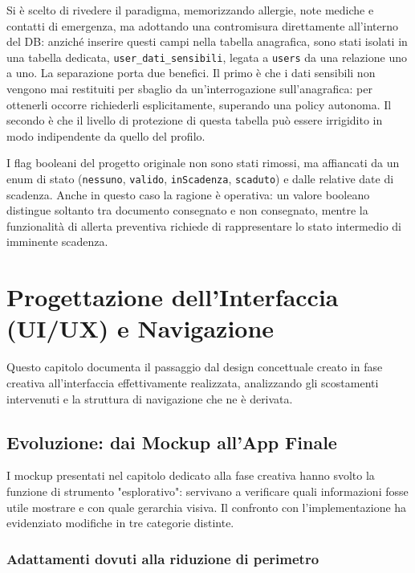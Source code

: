 \documentclass[11pt]{article}
\numberwithin{figure}{section}
\begin{document}
Si è scelto di rivedere il paradigma, memorizzando allergie, note mediche e contatti di emergenza, ma adottando una contromisura direttamente all'interno del DB: anziché inserire questi campi nella tabella anagrafica, sono stati isolati in una tabella dedicata, \texttt{user\_dati\_sensibili}, legata a \texttt{users} da una relazione uno a uno. La separazione porta due benefici. Il primo è che i dati sensibili non vengono mai restituiti per sbaglio da un'interrogazione sull'anagrafica: per ottenerli occorre richiederli esplicitamente, superando una policy autonoma. Il secondo è che il livello di protezione di questa tabella può essere irrigidito in modo indipendente da quello del profilo.

I flag booleani del progetto originale non sono stati rimossi, ma affiancati da un enum di stato (\texttt{nessuno}, \texttt{valido}, \texttt{inScadenza}, \texttt{scaduto}) e dalle relative date di scadenza. Anche in questo caso la ragione è operativa: un valore booleano distingue soltanto tra documento consegnato e non consegnato, mentre la funzionalità di allerta preventiva richiede di rappresentare lo stato intermedio di imminente scadenza.

\section{Progettazione dell'Interfaccia (UI/UX) e Navigazione}

Questo capitolo documenta il passaggio dal design concettuale creato in fase creativa all'interfaccia effettivamente realizzata, analizzando gli scostamenti intervenuti e la struttura di navigazione che ne è derivata.

\subsection{Evoluzione: dai Mockup all'App Finale}

I mockup presentati nel capitolo dedicato alla fase creativa hanno svolto la funzione di strumento "esplorativo": servivano a verificare quali informazioni fosse utile mostrare e con quale gerarchia visiva. Il confronto con l'implementazione ha evidenziato modifiche in tre categorie distinte.

\subsubsection{Adattamenti dovuti alla riduzione di perimetro}
\end{document}

